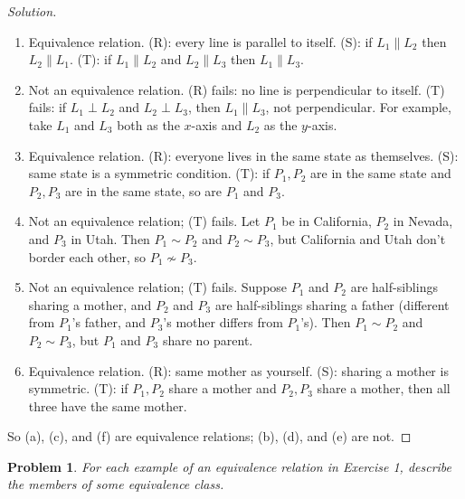 \documentclass[12pt]{article}
\newtheorem{problem}{Problem}
\begin{document}
\begin{proof}[Solution]
~
\begin{enumerate}[label=(\alph*)]
    \item Equivalence relation. (R): every line is parallel to itself. (S): if $L_1 \parallel L_2$ then $L_2 \parallel L_1$. (T): if $L_1 \parallel L_2$ and $L_2 \parallel L_3$ then $L_1 \parallel L_3$.

    \item Not an equivalence relation. (R) fails: no line is perpendicular to itself. (T) fails: if $L_1 \perp L_2$ and $L_2 \perp L_3$, then $L_1 \parallel L_3$, not perpendicular. For example, take $L_1$ and $L_3$ both as the $x$-axis and $L_2$ as the $y$-axis.

    \item Equivalence relation. (R): everyone lives in the same state as themselves. (S): same state is a symmetric condition. (T): if $P_1, P_2$ are in the same state and $P_2, P_3$ are in the same state, so are $P_1$ and $P_3$.

    \item Not an equivalence relation; (T) fails. Let $P_1$ be in California, $P_2$ in Nevada, and $P_3$ in Utah. Then $P_1 \sim P_2$ and $P_2 \sim P_3$, but California and Utah don't border each other, so $P_1 \not\sim P_3$.

    \item Not an equivalence relation; (T) fails. Suppose $P_1$ and $P_2$ are half-siblings sharing a mother, and $P_2$ and $P_3$ are half-siblings sharing a father (different from $P_1$'s father, and $P_3$'s mother differs from $P_1$'s). Then $P_1 \sim P_2$ and $P_2 \sim P_3$, but $P_1$ and $P_3$ share no parent.

    \item Equivalence relation. (R): same mother as yourself. (S): sharing a mother is symmetric. (T): if $P_1, P_2$ share a mother and $P_2, P_3$ share a mother, then all three have the same mother.
\end{enumerate}

So (a), (c), and (f) are equivalence relations; (b), (d), and (e) are not.
\end{proof}

\setcounter{problem}{1}
\begin{problem}
For each example of an equivalence relation in Exercise 1, describe the members of some equivalence class.
\end{problem}
\end{document}
